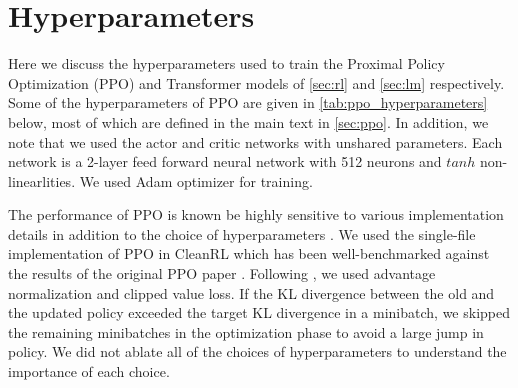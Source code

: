 
\section{Hyperparameters}\label{app:hyperparameters}

Here we discuss the hyperparameters used to train the Proximal Policy Optimization (PPO) and Transformer models of \autoref{sec:rl} and \autoref{sec:lm} respectively. 
Some of the hyperparameters of PPO are given in \autoref{tab:ppo_hyperparameters} below, most of which are defined in the main text in \autoref{sec:ppo}. In addition, we note that we used the actor and critic networks with unshared parameters. Each network is a 2-layer feed forward neural network with 512 neurons and $tanh$ non-linearlities. We used Adam optimizer for training. 
\newline 

The performance of PPO is known be highly sensitive to various implementation details in addition to the choice of hyperparameters \cite{shengyi2022the37implementation, engstrom2020implementation}. We used the single-file implementation of PPO in CleanRL \cite{huang2022cleanrl} which has been well-benchmarked against the results of the original PPO paper \cite{schulman2017proximal}. Following  \cite{engstrom2020implementation}, we used advantage normalization and clipped value loss. If the KL divergence between the old and the updated policy exceeded the target KL divergence in a minibatch, we skipped the remaining minibatches in the optimization phase to avoid a large jump in policy. 
We did not ablate all of the choices of hyperparameters to understand the importance of each choice.


